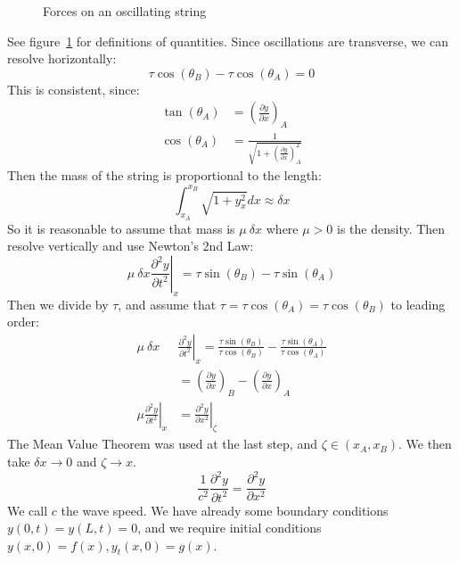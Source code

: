 \documentclass[../Main.tex]{subfiles}
\begin{document}
\begin{figure}
    \caption{Forces on an oscillating string}
    \label{figOscString}
\end{figure}
See figure~\ref{figOscString} for definitions of quantities. Since oscillations are transverse, we can resolve horizontally:
\begin{equation*}
    \tau \cos(\theta_B) - \tau \cos(\theta_A) = 0
\end{equation*}
This is consistent, since:
\begin{align*}
    \tan(\theta_A) &= \left(\frac{\partial y}{\partial x}\right)_A \\
    \cos(\theta_A) &= \frac{1}{\sqrt{1 + \left(\frac{\partial y}{\partial x}\right)_A^2}}
\end{align*}
Then the mass of the string is proportional to the length:
\begin{equation*}
    \int_{x_A}^{x_B} \sqrt{1 + y_x^2} dx \approx \delta x
\end{equation*}
So it is reasonable to assume that mass is $\mu~\delta x$ where $\mu > 0$ is the density.
Then resolve vertically and use Newton's 2nd Law:
\begin{equation*}
    \mu~\delta x \left.\frac{\partial^{2}y}{\partial t^{2}}\right|_x = \tau\sin(\theta_B) - \tau\sin(\theta_A)
\end{equation*}
Then we divide by $\tau$, and assume that $\tau = \tau\cos(\theta_A) = \tau\cos(\theta_B)$ to leading order:
\begin{align*}
    \mu~\delta x &\left.\frac{\partial^{2}y}{\partial t^{2}}\right|_x = \frac{\tau\sin(\theta_B)}{\tau \cos(\theta_B)} - \frac{\tau\sin(\theta_A)}{\tau \cos(\theta_A)} \\
    &= \left(\frac{\partial y}{\partial x}\right)_B - \left(\frac{\partial y}{\partial x}\right)_A \\
    \mu \left.\frac{\partial^{2}y}{\partial t^{2}}\right|_x &= \left.\frac{\partial^{2}y}{\partial x^{2}} \right|_{\zeta}
\end{align*}
The Mean Value Theorem was used at the last step, and $\zeta \in (x_A, x_B)$. We then take $\delta x \to 0$ and $\zeta \to x$.
\begin{equation}
    \frac{1}{c^2} \frac{\partial^{2}y}{\partial t^{2}} = \frac{\partial^{2}y}{\partial x^{2}}
    \label{eqnWave}
\end{equation}
We call $c$ the wave speed. We have already some boundary conditions $y(0, t) = y(L, t) = 0$, and we require initial conditions $y(x, 0) = f(x), y_t(x, 0) = g(x)$.
\end{document}
